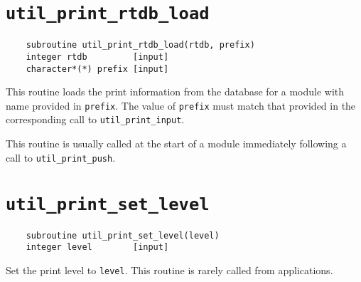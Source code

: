 \section{{\tt util\_print\_rtdb\_load}}
\begin{verbatim}
    subroutine util_print_rtdb_load(rtdb, prefix)
    integer rtdb         [input]
    character*(*) prefix [input]
\end{verbatim}
This routine loads the print information from the database for a
module with name provided in \verb+prefix+.  The value of
\verb+prefix+ must match that provided in the corresponding call to
\verb+util_print_input+.

This routine is usually called at the start of a module immediately
following a call to \verb+util_print_push+.

\section{{\tt util\_print\_set\_level}}
\begin{verbatim}
    subroutine util_print_set_level(level)
    integer level        [input]
\end{verbatim}
Set the print level to {\tt level}.  This routine is rarely called
from applications.

